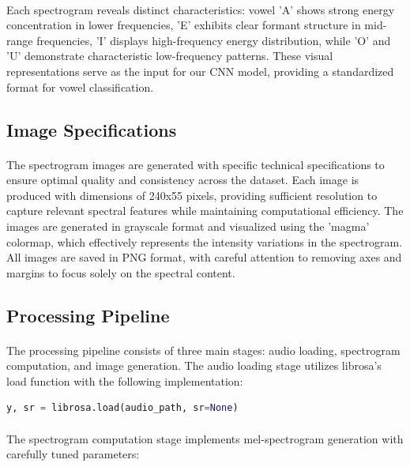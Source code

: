 \paragraph{}
Each spectrogram reveals distinct characteristics: vowel 'A' shows strong energy concentration in lower frequencies, 'E' exhibits clear formant structure in mid-range frequencies, 'I' displays high-frequency energy distribution, while 'O' and 'U' demonstrate characteristic low-frequency patterns. These visual representations serve as the input for our CNN model, providing a standardized format for vowel classification.

\subsection{Image Specifications}

\paragraph{}
The spectrogram images are generated with specific technical specifications to ensure optimal quality and consistency across the dataset. Each image is produced with dimensions of 240x55 pixels, providing sufficient resolution to capture relevant spectral features while maintaining computational efficiency. The images are generated in grayscale format and visualized using the 'magma' colormap, which effectively represents the intensity variations in the spectrogram. All images are saved in PNG format, with careful attention to removing axes and margins to focus solely on the spectral content.

\subsection{Processing Pipeline}

\paragraph{}
The processing pipeline consists of three main stages: audio loading, spectrogram computation, and image generation. The audio loading stage utilizes librosa's load function with the following implementation:

\begin{lstlisting}[language=Python, caption={Audio Loading Code}]
y, sr = librosa.load(audio_path, sr=None)
\end{lstlisting}

\paragraph{}
The spectrogram computation stage implements mel-spectrogram generation with carefully tuned parameters:

